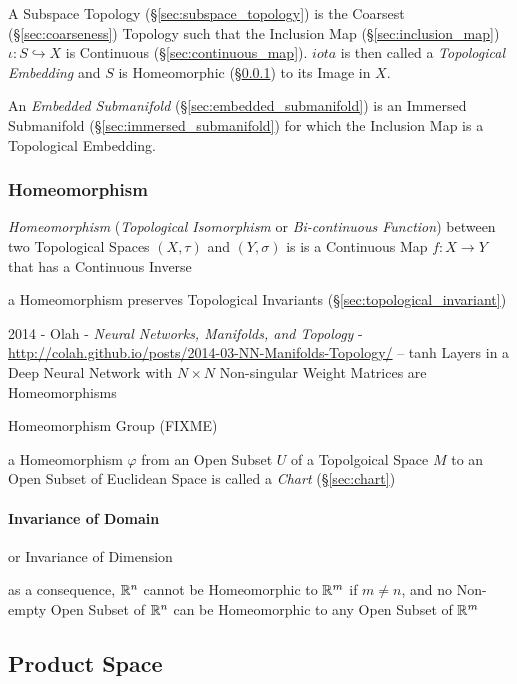 A Subspace Topology (\S\ref{sec:subspace_topology}) is the Coarsest
(\S\ref{sec:coarseness}) Topology such that the Inclusion Map
(\S\ref{sec:inclusion_map}) $\iota : S \hookrightarrow X$ is
Continuous (\S\ref{sec:continuous_map}). $iota$ is then called a
\emph{Topological Embedding} and $S$ is Homeomorphic
(\S\ref{sec:homeomorphism}) to its Image in $X$.

An \emph{Embedded Submanifold} (\S\ref{sec:embedded_submanifold}) is an
Immersed Submanifold (\S\ref{sec:immersed_submanifold}) for which the Inclusion
Map is a Topological Embedding.



\subsubsection{Homeomorphism}\label{sec:homeomorphism}

\emph{Homeomorphism} (\emph{Topological Isomorphism} or \emph{Bi-continuous
  Function}) between two Topological Spaces $(X, \tau)$ and $(Y, \sigma)$ is is
a Continuous Map $f : X \rightarrow Y$ that has a Continuous Inverse

a Homeomorphism preserves Topological Invariants
(\S\ref{sec:topological_invariant})

2014 - Olah - \emph{Neural Networks, Manifolds, and Topology} -
\url{http://colah.github.io/posts/2014-03-NN-Manifolds-Topology/} -- tanh Layers
in a Deep Neural Network with $N \times N$ Non-singular Weight Matrices are
Homeomorphisms

Homeomorphism Group (FIXME)

a Homeomorphism $\varphi$ from an Open Subset $U$ of a Topolgoical Space $M$ to
an Open Subset of Euclidean Space is called a \emph{Chart} (\S\ref{sec:chart})



\paragraph{Invariance of Domain}\label{sec:domain_invariance}\hfill

or Invariance of Dimension

as a consequence, $\mathbb{R}^n$ cannot be Homeomorphic to $\mathbb{R}^m$ if $m \neq n$,
and no Non-empty Open Subset of $\mathbb{R}^n$ can be Homeomorphic to any Open
Subset of $\mathbb{R}^m$



\subsection{Product Space}\label{sec:product_space}

